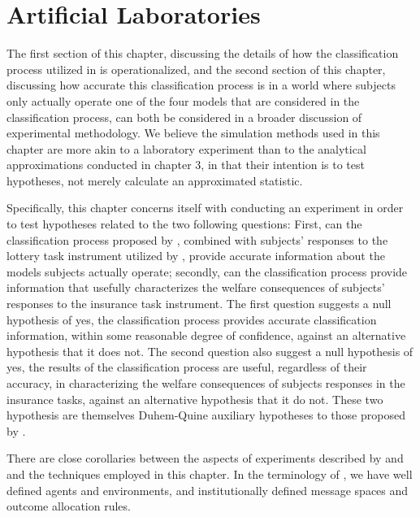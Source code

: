 \documentclass[../main.tex]{subfiles}
\begin{document}
\section{Artificial Laboratories}

The first section of this chapter, discussing the details of how the classification process utilized in \textcite{Harrison2016} is operationalized, and the second section of this chapter, discussing how accurate this classification process is in a world where subjects only actually operate one of the four models that are considered in the classification process, can both be considered in a broader discussion of experimental methodology.
We believe the simulation methods used in this chapter are more akin to a laboratory experiment than to the analytical approximations conducted in chapter 3, in that their intention is to test hypotheses, not merely calculate an approximated statistic.

Specifically, this chapter concerns itself with conducting an experiment in order to test hypotheses related to the two following questions:
First, can the classification process proposed by \textcite{Harrison2016}, combined with subjects' responses to the lottery task instrument utilized by \textcite{Harrison2016}, provide accurate information about the models subjects actually operate;
secondly, can the classification process provide information that usefully characterizes the welfare consequences of subjects' responses to the insurance task instrument.
The first question suggests a null hypothesis of yes, the classification process provides accurate classification information, within some reasonable degree of confidence, against an alternative hypothesis that it does not.
The second question also suggest a null hypothesis of yes, the results of the classification process are useful, regardless of their accuracy, in characterizing the welfare consequences of subjects responses in the insurance tasks, against an alternative hypothesis that it do not.
These two hypothesis are themselves Duhem-Quine \parencite{Duhem1954, Quine1953} auxiliary hypotheses to those proposed by \textcite{Harrison2016}.

There are close corollaries between the aspects of experiments described by \textcite{Harrison2004} and \textcite{Smith1982} and the techniques employed in this chapter.
In the terminology of \textcite[924-927]{Smith1982}, we have well defined agents and environments, and institutionally defined message spaces and outcome allocation rules.
\end{document}
